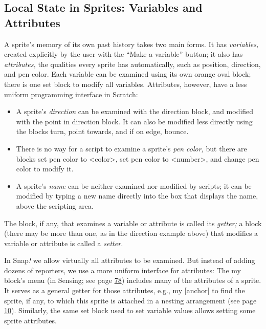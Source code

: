 \subsection{\texorpdfstring{ Local State in Sprites: Variables and
Attributes}{ Local State in Sprites: Variables and Attributes}}\label{local-state-in-sprites-variables-and-attributes}

A sprite's memory of its own past history takes two main forms. It has
\emph{variables,} created explicitly by the user with the ``Make a
variable'' button; it also has \emph{attributes,} the qualities every
sprite has automatically, such as position, direction, and pen color.
Each variable can be examined using its own orange oval block; there is
one set block to modify all variables. Attributes, however, have a less
uniform programming interface in Scratch:

\begin{itemize}
\item
  A sprite's \emph{direction} can be examined with the direction block,
  and modified with the point in direction block. It can also be
  modified less directly using the blocks turn, point towards, and if on
  edge, bounce.
\item
  There is no way for a script to examine a sprite's \emph{pen color,}
  but there are blocks set pen color to \textless color\textgreater, set
  pen color to \textless number\textgreater, and change pen color to
  modify it.
\item
  A sprite's \emph{name} can be neither examined nor modified by
  scripts; it can be modified by typing a new name directly into the box
  that displays the name, above the scripting area.
\end{itemize}

The block, if any, that examines a variable or attribute is called its
\emph{getter;} a block (there may be more than one, as in the direction
example above) that modifies a variable or attribute is called a
\emph{setter.}

In Snap\emph{!} we allow virtually all attributes to be examined. But
instead of adding dozens of reporters, we use a more uniform interface
for attributes: The my block's menu (in Sensing; see page
\hyperref[attrib.pnglist-of-attributes]{78}) includes many of the
attributes of a sprite. It serves as a general getter for those
attributes, e.g., my {[}anchor{]} to find the sprite, if any, to which
this sprite is attached in a nesting arrangement (see page
\hyperref[nesting-sprites-anchors-and-parts]{10}). Similarly, the same
set block used to set variable values allows setting some sprite
attributes.

